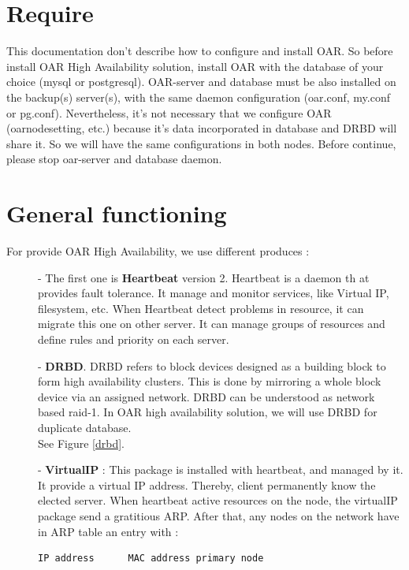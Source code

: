 \documentclass[a4paper,10pt]{report}
\begin{document}
\section{Require}
This documentation don't describe how to configure and install OAR. So before install OAR High Availability solution, 
install OAR with the database of your choice (mysql or postgresql). OAR-server and database must be also installed on the backup(s) server(s), 
with the same daemon configuration (oar.conf, my.conf or pg.conf). 
Nevertheless, it's not necessary that we configure OAR (oarnodesetting, etc.) because it's data incorporated in database and DRBD will share it. So we will have the same configurations in both nodes.
Before continue, please stop oar-server and database daemon.



\section{General functioning}
For provide OAR High Availability, we use different produces :
\begin{description}
\item[]- The first one is \textbf{Heartbeat} version 2. Heartbeat is a daemon th
at provides fault tolerance. It manage and monitor services, like Virtual IP, filesystem, etc. When Heartbeat detect problems in resource, it can migrate this one on other server. It can manage groups of resources and define rules and priority on each server.
\item[]- \textbf{DRBD}. DRBD refers to block devices designed as a building block to form high availability clusters. This is done by mirroring a whole block device via an assigned network. DRBD can be understood as network based raid-1. In OAR high availability solution, we will use DRBD for duplicate database.\\
See Figure \ref{drbd}.
\item[]- \textbf{VirtualIP} : This package is installed with heartbeat, and managed by it. It provide a virtual IP address. Thereby, client permanently know the elected server.
When heartbeat active resources on the node, the virtualIP package send a gratitious ARP. After that, any nodes on the network have in ARP table an entry with :
\begin{lstlisting}
IP address		MAC address primary node
\end{lstlisting}

\end{description}
\end{document}
